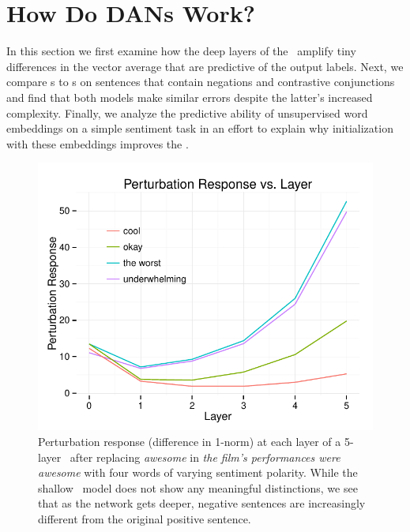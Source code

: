 
\section{How Do DANs Work?}
\label{sec:discussion}

In this section we first examine how the deep layers of the \dan\ amplify tiny
differences in the vector average that are predictive of the output
labels. Next, we compare \dan s to \drnn s on sentences that contain negations
and contrastive conjunctions and find that both models make similar errors
despite the latter's increased complexity. Finally, we analyze the predictive
ability of unsupervised word embeddings on a simple sentiment task in an effort
to explain why initialization with these embeddings improves the \dan.




\begin{figure}[t!]
\includegraphics[scale=0.6]{2015_acl_dan/figures/perturb_2.pdf}
  \caption{Perturbation response (difference in 1-norm) at each layer of a 5-layer \dan\ after replacing \emph{awesome} in \emph{the film's performances were awesome} with four words of varying sentiment polarity. While the shallow \nbow\ model does not show any meaningful distinctions, we see that as the network gets deeper, negative sentences are increasingly different from the original positive sentence.}
\label{fig:perturb}

\end{figure}

